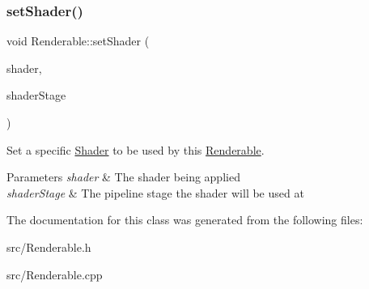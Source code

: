\subsubsection{\texorpdfstring{setShader()}{setShader()}}
{\footnotesize\ttfamily void Renderable\+::set\+Shader (\begin{DoxyParamCaption}\item[{std\+::shared\+\_\+ptr$<$ \mbox{\hyperlink{class_shader}{Shader}} $>$}]{shader,  }\item[{Vk\+Shader\+Stage\+Flag\+Bits}]{shader\+Stage }\end{DoxyParamCaption})}



Set a specific \mbox{\hyperlink{class_shader}{Shader}} to be used by this \mbox{\hyperlink{class_renderable}{Renderable}}. 


\begin{DoxyParams}{Parameters}
{\em shader} & The shader being applied \\
\hline
{\em shader\+Stage} & The pipeline stage the shader will be used at \\
\hline
\end{DoxyParams}


The documentation for this class was generated from the following files\+:\begin{DoxyCompactItemize}
\item 
src/Renderable.\+h\item 
src/Renderable.\+cpp\end{DoxyCompactItemize}
